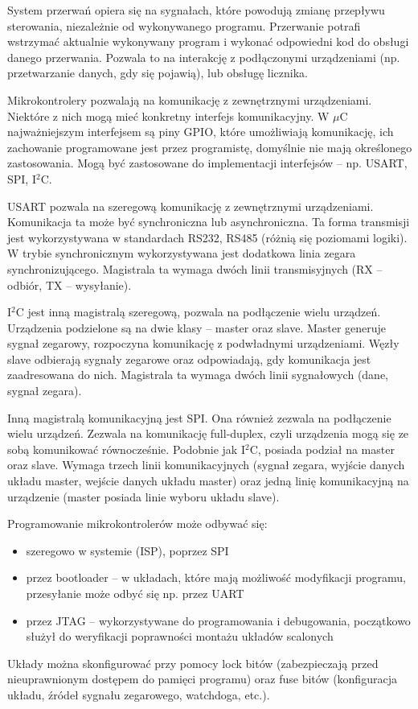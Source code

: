 System przerwań opiera się na sygnałach, które powodują zmianę przepływu sterowania, niezależnie od wykonywanego programu. Przerwanie potrafi wstrzymać aktualnie wykonywany program i wykonać odpowiedni kod do obsługi danego przerwania. Pozwala to na interakcję z podłączonymi urządzeniami (np. przetwarzanie danych, gdy się pojawią), lub obsługę licznika.

Mikrokontrolery pozwalają na komunikację z zewnętrznymi urządzeniami. Niektóre z nich mogą mieć konkretny interfejs komunikacyjny. W $\mu$C najważniejszym interfejsem są piny GPIO, które umożliwiają komunikację, ich zachowanie programowane jest przez programistę, domyślnie nie mają określonego zastosowania. Mogą być zastosowane do implementacji interfejsów -- np. USART, SPI, I$^{2}$C. 

USART pozwala na szeregową komunikację z zewnętrznymi urządzeniami. Komunikacja ta może być synchroniczna lub asynchroniczna. Ta forma transmisji jest wykorzystywana w standardach RS232, RS485 (różnią się poziomami logiki). W trybie synchronicznym wykorzystywana jest dodatkowa linia zegara synchronizującego. Magistrala ta wymaga dwóch linii transmisyjnych (RX -- odbiór, TX -- wysyłanie).

I$^{2}$C jest inną magistralą szeregową, pozwala na podłączenie wielu urządzeń. Urządzenia podzielone są na dwie klasy -- master oraz slave. Master generuje sygnał zegarowy, rozpoczyna komunikację z podwładnymi urządzeniami. Węzły slave odbierają sygnały zegarowe oraz odpowiadają, gdy komunikacja jest zaadresowana do nich. Magistrala ta wymaga dwóch linii sygnałowych (dane, sygnał zegara).

Inną magistralą komunikacyjną jest SPI. Ona również zezwala na podłączenie wielu urządzeń. Zezwala na komunikację full-duplex, czyli urządzenia mogą się ze sobą komunikować równocześnie. Podobnie jak I$^{2}$C, posiada podział na master oraz slave. Wymaga trzech linii komunikacyjnych (sygnał zegara, wyjście danych układu master, wejście danych układu master) oraz jedną linię komunikacyjną na urządzenie (master posiada linie wyboru układu slave).

Programowanie mikrokontrolerów może odbywać się:
\begin{itemize}
\item szeregowo w systemie (ISP), poprzez SPI
\item przez bootloader -- w układach, które mają możliwość modyfikacji programu, przesyłanie może odbyć się np. przez UART
\item przez JTAG -- wykorzystywane do programowania i debugowania, początkowo służył do weryfikacji poprawności montażu układów scalonych
\end{itemize}
Układy można skonfigurować przy pomocy lock bitów (zabezpieczają przed nieuprawnionym dostępem do pamięci programu) oraz fuse bitów (konfiguracja układu, źródeł sygnału zegarowego, watchdoga, etc.).

